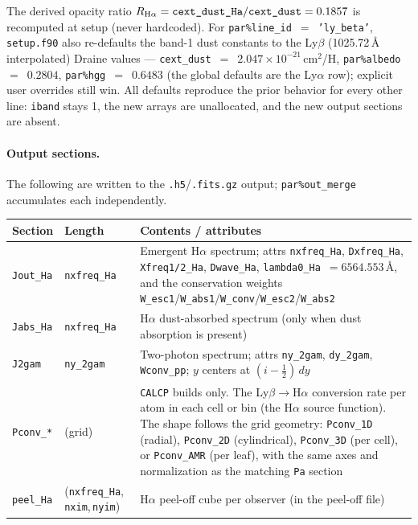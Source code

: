 \documentclass[english,a4paper]{my_memo}
\newcommand{\parm}[1]{\texttt{par\%#1}}
\begin{document}
The derived opacity ratio
$R_{\rm H\alpha} = \texttt{cext\_dust\_Ha}/\texttt{cext\_dust} = 0.1857$ is
recomputed at setup (never hardcoded). For \parm{line\_id}~$=$~\texttt{'ly\_beta'},
\texttt{setup.f90} also re-defaults the band-1 dust constants to the Ly$\beta$
(1025.72\,\AA{} interpolated) Draine values --- \texttt{cext\_dust}~$=$~$2.047\times10^{-21}$\,cm$^2$/H,
\parm{albedo}~$=$~$0.2804$, \parm{hgg}~$=$~$0.6483$ (the global defaults are the
Ly$\alpha$ row); explicit user overrides still win. All defaults reproduce the
prior behavior for every other line: \texttt{iband} stays 1, the new arrays are
unallocated, and the new output sections are absent.

\paragraph{Output sections.}
The following are written to the \texttt{.h5}/\texttt{.fits.gz} output;
\parm{out\_merge} accumulates each independently.

\begin{center}
\begin{tabular}{@{}l l L{6.6cm}@{}}
\toprule
Section & Length & Contents / attributes \\
\midrule
\texttt{Jout\_Ha} & \texttt{nxfreq\_Ha} & Emergent H$\alpha$ spectrum; attrs \texttt{nxfreq\_Ha}, \texttt{Dxfreq\_Ha}, \texttt{Xfreq1/2\_Ha}, \texttt{Dwave\_Ha}, \texttt{lambda0\_Ha}~$=6564.553$\,\AA, and the conservation weights \texttt{W\_esc1}/\texttt{W\_abs1}/\texttt{W\_conv}/\texttt{W\_esc2}/\texttt{W\_abs2} \\
\texttt{Jabs\_Ha} & \texttt{nxfreq\_Ha} & H$\alpha$ dust-absorbed spectrum (only when dust absorption is present) \\
\texttt{J2gam}    & \texttt{ny\_2gam}   & Two-photon spectrum; attrs \texttt{ny\_2gam}, \texttt{dy\_2gam}, \texttt{Wconv\_pp}; $y$ centers at $(i-\tfrac12)\,dy$ \\
\texttt{Pconv\_*} & (grid) & \texttt{CALCP} builds only. The Ly$\beta\rightarrow$H$\alpha$ conversion rate per atom in each cell or bin (the H$\alpha$ source function). The shape follows the grid geometry: \texttt{Pconv\_1D} (radial), \texttt{Pconv\_2D} (cylindrical), \texttt{Pconv\_3D} (per cell), or \texttt{Pconv\_AMR} (per leaf), with the same axes and normalization as the matching \texttt{Pa} section \\
\texttt{peel\_Ha} & (\texttt{nxfreq\_Ha},\,\texttt{nxim},\,\texttt{nyim}) & H$\alpha$ peel-off cube per observer (in the peel-off file) \\
\bottomrule
\end{tabular}
\end{center}
\end{document}

